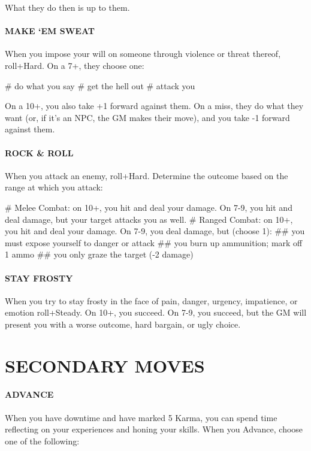 What they do then is up to them.


\paragraph{MAKE ‘EM SWEAT}
When you impose your will on someone through violence or threat thereof, roll+Hard. On a 7+, they choose one:

\begin{easylist}
# do what you say
# get the hell out
# attack you    
\end{easylist}

On a 10+, you also take +1 forward against them. On a miss, they do what they want (or, if it’s an NPC, the GM makes their move), and you take -1 forward against them.


\paragraph{ROCK \& ROLL}
When you attack an enemy, roll+Hard. Determine the outcome based on the range at which you attack:

\begin{easylist}
# Melee Combat: on 10+, you hit and deal your damage. On 7-9, you hit and deal damage, but your target attacks you as well.
# Ranged Combat: on 10+, you hit and deal your damage. On 7-9, you deal damage, but (choose 1):
## you must expose yourself to danger or attack
## you burn up ammunition; mark off 1 ammo
## you only graze the target (-2 damage)
\end{easylist}


\paragraph{STAY FROSTY}
When you try to stay frosty in the face of pain, danger, urgency, impatience, or emotion roll+Steady. On 10+, you succeed. On 7-9, you succeed, but the GM will present you with a worse outcome, hard bargain, or ugly choice.



\section{SECONDARY MOVES}

\paragraph{ADVANCE}
When you have downtime and have marked 5 Karma, you can spend time reflecting on your experiences and honing your skills. When you Advance, choose one of the following:

